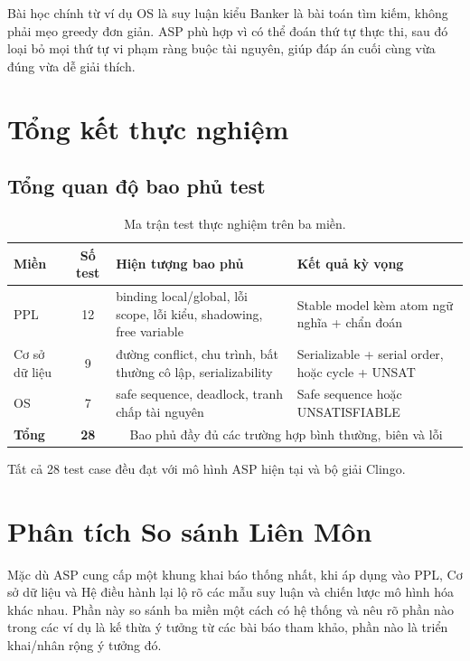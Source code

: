 \documentclass[a4paper,11pt]{article}
\begin{document}
Bài học chính từ ví dụ OS là suy luận kiểu Banker là bài toán tìm kiếm, không phải mẹo greedy đơn giản.
ASP phù hợp vì có thể đoán thứ tự thực thi, sau đó loại bỏ mọi thứ tự vi phạm ràng buộc tài nguyên,
giúp đáp án cuối cùng vừa đúng vừa dễ giải thích.

\section{Tổng kết thực nghiệm}\label{sec:summary}

\subsection{Tổng quan độ bao phủ test}

\begin{table}[h!]
\centering
\small
\begin{tabular}{|l|c|p{4.5cm}|p{3.5cm}|}
\hline
\textbf{Miền} & \textbf{Số test} & \textbf{Hiện tượng bao phủ} & \textbf{Kết quả kỳ vọng} \\
\hline
PPL & 12 & binding local/global, lỗi scope, lỗi kiểu, shadowing, free variable & Stable model kèm atom ngữ nghĩa + chẩn đoán \\
\hline
Cơ sở dữ liệu & 9 & đường conflict, chu trình, bất thường cô lập, serializability & Serializable + serial order, hoặc cycle + UNSAT \\
\hline
OS & 7 & safe sequence, deadlock, tranh chấp tài nguyên & Safe sequence hoặc UNSATISFIABLE \\
\hline
\textbf{Tổng} & \textbf{28} & \multicolumn{2}{c|}{Bao phủ đầy đủ các trường hợp bình thường, biên và lỗi} \\
\hline
\end{tabular}
\caption{Ma trận test thực nghiệm trên ba miền.}
\label{tab:coverage}
\end{table}

Tất cả 28 test case đều đạt với mô hình ASP hiện tại và bộ giải Clingo.


\section{Phân tích So sánh Liên Môn}\label{sec:crossdomain}

Mặc dù ASP cung cấp một khung khai báo thống nhất, khi áp dụng vào PPL, Cơ sở dữ liệu và Hệ điều hành lại lộ rõ
các mẫu suy luận và chiến lược mô hình hóa khác nhau. Phần này so sánh ba miền một cách có hệ thống và nêu rõ
phần nào trong các ví dụ là kế thừa ý tưởng từ các bài báo tham khảo, phần nào là triển khai/nhân rộng ý tưởng đó.
\end{document}
